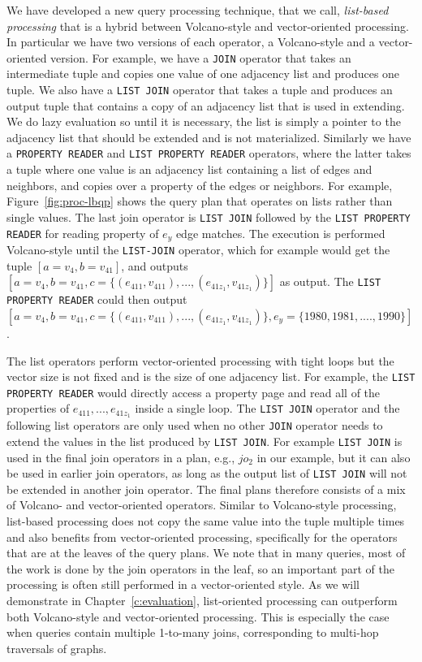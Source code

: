We have developed a new query processing technique, that we call, {\em list-based processing} that is a hybrid between Volcano-style and vector-oriented processing. In particular we have two versions of each operator, a Volcano-style and a vector-oriented version. For example, we have a \texttt{JOIN} operator that takes an intermediate tuple and copies one value of one adjacency list and produces one tuple. We also have a \texttt{LIST JOIN} operator that takes a tuple and produces an output tuple that contains a copy of an adjacency list that is used in extending. We do lazy evaluation so until it is necessary, the list is simply a pointer to the adjacency list that should be extended and is not materialized. Similarly we have a \texttt{PROPERTY READER} and \texttt{LIST PROPERTY READER} operators, where the latter takes a tuple where one value is an adjacency list containing a list of edges and neighbors, and copies over a property of the edges or neighbors. For example, Figure~\ref{fig:proc-lbqp} shows the query plan that operates on lists rather than single values. The last join operator is \texttt{LIST JOIN} followed by the \texttt{LIST PROPERTY READER} for reading property of $e_y$ edge matches. The execution is performed Volcano-style until the \texttt{LIST-JOIN} operator, which for example would get the tuple $[a=v_4, b=v_{41}]$, and outputs $[a=v_4, b=v_{41}, c=\{(e_{411}, v_{411}), ..., (e_{41z_1}, v_{41z_1})\}]$ as output. The \texttt{LIST PROPERTY READER} could then output  $[a=v_4, b=v_{41}, c=\{(e_{411}, v_{411}), ..., (e_{41z_1}, v_{41z_1})\}, e_y=\{1980, 1981, ...., 1990\}]$. 

The list operators perform vector-oriented processing with tight loops but the vector size is not fixed and is the size of one adjacency list. For example, the \texttt{LIST PROPERTY READER} would directly access a property page and read all of the properties of $e_{411}, ..., e_{41z_1}$ inside a single loop. The \texttt{LIST JOIN} operator and the following list operators are only used when no other \texttt{JOIN} operator needs to extend the values in the list produced by \texttt{LIST JOIN}. For example \texttt{LIST JOIN} is used in the final join operators in a plan, e.g., $jo_2$ in our example, but it can also be used in earlier join operators, as long as the output list of \texttt{LIST JOIN} will not be extended in another join operator. The final plans therefore consists of a mix of Volcano- and vector-oriented operators. Similar to Volcano-style processing, list-based processing does not copy the same value into the tuple multiple times and also benefits from vector-oriented processing, specifically for the operators that are at the leaves of the query plans. We note that in many queries, most of the work is done by the join operators in the leaf, so an important part of the processing is often still performed in a vector-oriented style. As we will demonstrate in Chapter~\ref{c:evaluation}, list-oriented processing can outperform both Volcano-style and vector-oriented processing. This is especially the case when queries contain multiple 1-to-many joins, corresponding to multi-hop traversals of graphs.

